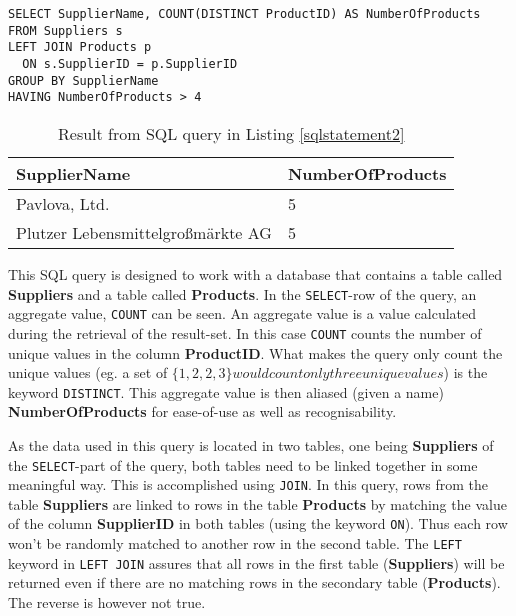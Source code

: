 \begin{lstlisting}[caption={SQL Query to retrieve all suppliers carrying more
      than four products.},label={sqlstatement2}]
SELECT SupplierName, COUNT(DISTINCT ProductID) AS NumberOfProducts
FROM Suppliers s
LEFT JOIN Products p
  ON s.SupplierID = p.SupplierID
GROUP BY SupplierName
HAVING NumberOfProducts > 4
\end{lstlisting}

\begin{table}[h]
  \centering
  \begin{tabular}{ | l | l | }
    \hline
    \textbf{SupplierName} & \textbf{NumberOfProducts} \\
    \hline
    Pavlova, Ltd. & 5  \\
    \hline
    Plutzer Lebensmittelgro{\ss}märkte AG & 5 \\
    \hline
  \end{tabular}
  \caption{Result from SQL query in Listing \ref{sqlstatement2}}
  \label{table:sql2}
\end{table}


This SQL query is designed to work with a database that contains a table
called \textbf{Suppliers} and a table called \textbf{Products}. In the
\texttt{SELECT}-row of the query, an aggregate value, \texttt{COUNT} can be
seen. An aggregate value is a value calculated during the retrieval of the
result-set. In this case \texttt{COUNT} counts the number of unique
values in the column \textbf{ProductID}. What makes the query only count
the unique values (eg. a set of $\{1,2,2,3\} would count only three unique
values$) is the keyword \texttt{DISTINCT}. This aggregate value is then
aliased (given a name) \textbf{NumberOfProducts} for ease-of-use as well
as recognisability.

As the data used in this query is located in two tables, one being
\textbf{Suppliers} of the \texttt{SELECT}-part of the query, both
tables need to be linked together in some meaningful way. This is
accomplished using \texttt{JOIN}. In this query, rows from the table
\textbf{Suppliers} are linked to rows in the table \textbf{Products}
by matching the value of the column \textbf{SupplierID} in both
tables (using the keyword \texttt{ON}). Thus each row won't be
randomly matched to another row in the second table. The \texttt{LEFT}
keyword in \texttt{LEFT JOIN} assures that all rows in the first table
(\textbf{Suppliers}) will be returned even if there are no matching
rows in the secondary table (\textbf{Products}). The reverse is however
not true.

